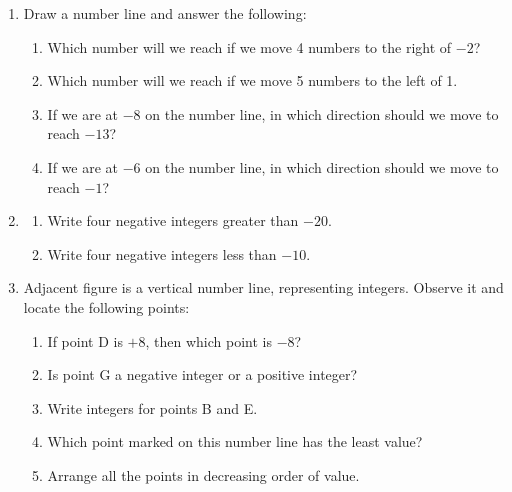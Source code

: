 \documentclass[a4paper,leqno,12pt]{amsart}
\begin{document}
\begin{enumerate}
\item Draw a number line and answer the following:
\begin{enumerate}
\item Which number will we reach if we move 4 numbers to the right of $-2$?
\item Which number will we reach if we move 5 numbers to the left of 1.
\item If we are at $-8$ on the number line, in which direction should we move to
reach $-13$?
\item If we are at $-6$ on the number line, in which direction should we move to
reach $-1$?
\end{enumerate}

\item
\begin{enumerate}
\item Write four negative integers greater than $-20$.
\item Write four negative integers less than $-10$.
\end{enumerate}
\item Adjacent figure is a vertical number line, representing integers. Observe
it and locate the following points:
\begin{enumerate}
\item If point D is $+8$, then which point is $-8$?
\item Is point G a negative integer or a positive integer?
\item Write integers for points B and E.
\item Which point marked on this number line has the least value?
\item Arrange all the points in decreasing order of value.
\end{enumerate}




\end{enumerate}
\end{document}
